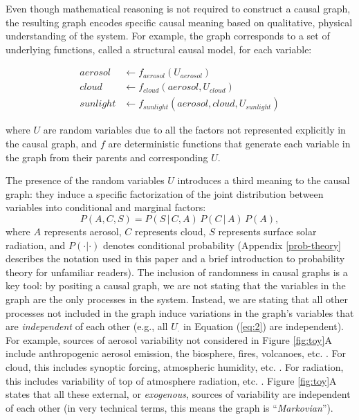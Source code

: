 \documentclass[12pt]{article}
\begin{document}
Even though mathematical reasoning is not required to construct a
causal graph, the resulting graph encodes specific causal meaning
based on qualitative, physical understanding of the system. For
example, the graph corresponds to a set of underlying functions,
called a structural causal model, for each variable:

\begin{align}
  \label{eq:2}
  aerosol &\leftarrow f_{aerosol} (U_{aerosol}) \\
  cloud &\leftarrow f_{cloud} (aerosol, U_{cloud})\\
  sunlight &\leftarrow f_{sunlight} (aerosol, cloud, U_{sunlight})
\end{align}

where $U$ are random variables due to all the factors not represented
explicitly in the causal graph, and $f$ are deterministic functions
that generate each variable in the graph from their parents and
corresponding $U$.

The presence of the random variables $U$ introduces a third meaning to
the causal graph: they induce a specific factorization of the joint
distribution between variables into conditional and marginal factors:
\begin{equation}
  P(A, C, S) = P(S \, | \,C, A) \, P(C \, | \, A) \, P(A),
\end{equation}
where $A$ represents aerosol, $C$ represents cloud, $S$ represents
surface solar radiation, and $P(\cdot | \cdot)$ denotes conditional
probability (Appendix \ref{prob-theory} describes the notation used in
this paper and a brief introduction to probability theory for
unfamiliar readers). The inclusion of randomness in causal graphs is a
key tool: by positing a causal graph, we are not stating that the
variables in the graph are the only processes in the system. Instead,
we are stating that all other processes not included in the graph
induce variations in the graph's variables that are \emph{independent} of
each other (e.g., all $U_{\cdot}$ in Equation (\ref{eq:2}) are
independent). For example, sources of aerosol variability not
considered in Figure \ref{fig:toy}A include anthropogenic aerosol
emission, the biosphere, fires, volcanoes,
etc. \citep[e.g.,][]{Boucher2015}. For cloud, this includes synoptic
forcing, atmospheric humidity,
etc. \citep[e.g.,][]{wallace2006atmospheric}. For radiation, this
includes variability of top of atmosphere radiation,
etc. \citep[e.g.,][]{hartmann2015global}. Figure \ref{fig:toy}A states
that all these external, or \textit{exogenous}, sources of variability
are independent of each other (in very technical terms, this means the
graph is ``\textit{Markovian}'').
\end{document}
